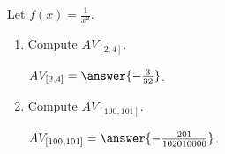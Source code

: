 \documentclass{ximera}
\author{Kenneth Berglund}
\begin{document}
\begin{exercise}

Let $f(x) = \frac{1}{x^2}$.

\begin{enumerate}
\item Compute $AV_{[2, 4]}$.

$AV_{[2, 4]} = \answer{-\frac{3}{32}}$.  

\item Compute $AV_{[100, 101]}$.

$AV_{[100, 101]} = \answer{-\frac{201}{102010000}}$.

	
\end{enumerate}

\end{exercise}
\end{document}
